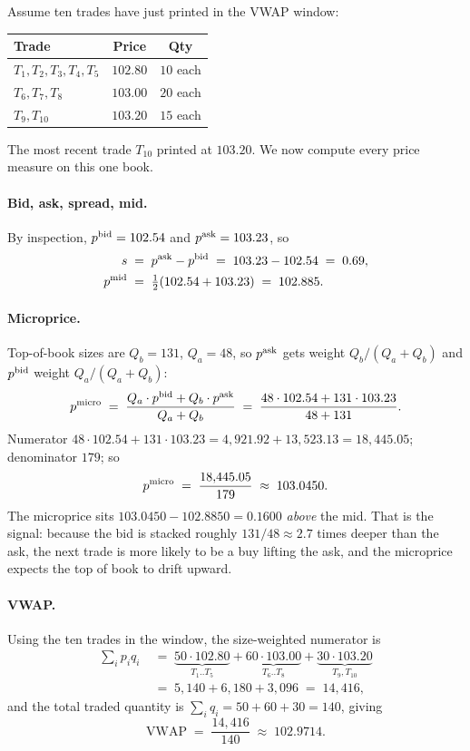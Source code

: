 Assume ten trades have just printed in the VWAP window:

\begin{center}
\begin{tabular}{lcc}
\toprule
Trade & Price & Qty \\
\midrule
$T_1, T_2, T_3, T_4, T_5$       & $102.80$ & $10$ each \\
$T_6, T_7, T_8$                 & $103.00$ & $20$ each \\
$T_9, T_{10}$                   & $103.20$ & $15$ each \\
\bottomrule
\end{tabular}
\end{center}

The most recent trade $T_{10}$ printed at $103.20$. We now compute
every price measure on this one book.

\paragraph{Bid, ask, spread, mid.} By inspection, $p^{\mathrm{bid}} = 102.54$
and $p^{\mathrm{ask}} = 103.23$, so
\begin{align*}
  s &\;=\; p^{\mathrm{ask}} - p^{\mathrm{bid}} \;=\; 103.23 - 102.54 \;=\; 0.69,\\
  p^{\mathrm{mid}}    &\;=\; \tfrac{1}{2}(102.54 + 103.23) \;=\; 102.885.
\end{align*}

\paragraph{Microprice.} Top-of-book sizes are $Q_b = 131$, $Q_a = 48$,
so $p^{\mathrm{ask}}$ gets weight $Q_b/(Q_a+Q_b)$ and $p^{\mathrm{bid}}$ weight $Q_a/(Q_a+Q_b)$:
\[
  p^{\mathrm{micro}}
  \;=\; \frac{Q_a \cdot p^{\mathrm{bid}} + Q_b \cdot p^{\mathrm{ask}}}{Q_a + Q_b}
  \;=\; \frac{48 \cdot 102.54 + 131 \cdot 103.23}{48 + 131}.
\]
Numerator $48 \cdot 102.54 + 131 \cdot 103.23 = 4{,}921.92 + 13{,}523.13 = 18{,}445.05$;
denominator $179$; so
\[
  p^{\mathrm{micro}} \;=\; \frac{18{,}445.05}{179} \;\approx\; 103.0450.
\]
The microprice sits $103.0450 - 102.8850 = 0.1600$ \emph{above} the
mid. That is the signal: because the bid is stacked roughly
$131/48 \approx 2.7$ times deeper than the ask, the next trade is
more likely to be a buy lifting the ask, and the microprice expects
the top of book to drift upward.

\paragraph{VWAP.} Using the ten trades in the window, the
size-weighted numerator is
\begin{align*}
  \sum_i p_i q_i
  &\;=\; \underbrace{50 \cdot 102.80}_{T_1..T_5}
       + \underbrace{60 \cdot 103.00}_{T_6..T_8}
       + \underbrace{30 \cdot 103.20}_{T_9,T_{10}} \\
  &\;=\; 5{,}140 + 6{,}180 + 3{,}096
  \;=\; 14{,}416,
\end{align*}
and the total traded quantity is $\sum_i q_i = 50 + 60 + 30 = 140$,
giving
\[
  \mathrm{VWAP} \;=\; \frac{14{,}416}{140} \;\approx\; 102.9714.
\]

